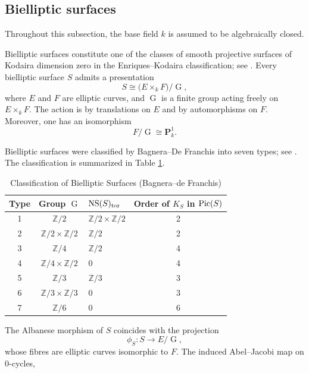 \documentclass[11pt,letterpaper]{amsart}
\newcommand{\Pic}{\textnormal{Pic}}
\newcommand{\NS}{\textnormal{NS}}
\numberwithin{equation}{section}
\theoremstyle{definition}
\theoremstyle{remark}
\newcommand{\Z}{\mathbb{Z}}
\newcommand{\bbP}{\mathbf{P}}
\DeclareMathOperator{\tor}{tor}
\DeclareMathOperator{\Gi}{G}
\begin{document}
\subsection{Bielliptic surfaces}\label{subsec:bielliptic} Throughout this subsection, the base field $k$ is assumed to be algebraically closed.\par 
Bielliptic surfaces constitute one of the classes of smooth projective surfaces of Kodaira dimension zero in the Enriques--Kodaira classification; see \cite{beauville_surfaces,BombieriMumford1977}. Every bielliptic surface $S$ admits a presentation \begin{equation*}\label{eq:presentation_S}
    S\cong\bigl(E\times_k F\bigr)/\Gi,\end{equation*}
where $E$ and $F$ are elliptic curves, and $\Gi$ is a finite group acting freely on $E\times_k F.$ The action is by translations on $E$ and by automorphisms on $F$. Moreover, one has an isomorphism $$F/\Gi\cong\bbP^{1}_k.$$\par
Bielliptic surfaces were classified by Bagnera--De Franchis into seven types; see \cite{bielliptic,bielliptic_suwa}. The classification is summarized in Table \ref{tab:bielliptic}.
\renewcommand{\arraystretch}{1.5} %
\begin{table}[h]
\centering
\caption{Classification of Bielliptic Surfaces (Bagnera--de Franchis)}
\label{tab:bielliptic}
\begin{tabular}{c c l c}
\hline
\textbf{Type} & \textbf{Group $\Gi$} & \textbf{$\NS(S)_{\tor}$} & \textbf{Order of $K_S$ in $\Pic(S)$} \\
\hline
1 & $\mathbb{Z}/2$ & $\Z/2\times\Z/2$ & 2 \\
2 & $\mathbb{Z}/2 \times \mathbb{Z}/2$ & $\Z/2$ & 2 \\
3 & $\mathbb{Z}/4$ & $\Z/2$ & 4 \\
4 & $\mathbb{Z}/4\times \mathbb{Z}/2$ & $0$ & 4 \\
5 & $\mathbb{Z}/3$ & $\Z/3$ & 3 \\
6 & $\mathbb{Z}/3 \times \mathbb{Z}/3$ & $0$ & 3 \\
7 & $\mathbb{Z}/6$ & $0$ & 6 \\
\hline
\end{tabular}
\end{table}
\par The Albanese morphism of $S$ coincides with the projection $$\phi_{S}\colon S\longrightarrow E/\Gi,$$ whose fibres are elliptic curves isomorphic to $F$. The induced Abel--Jacobi map on $0$-cycles,
\end{document}
